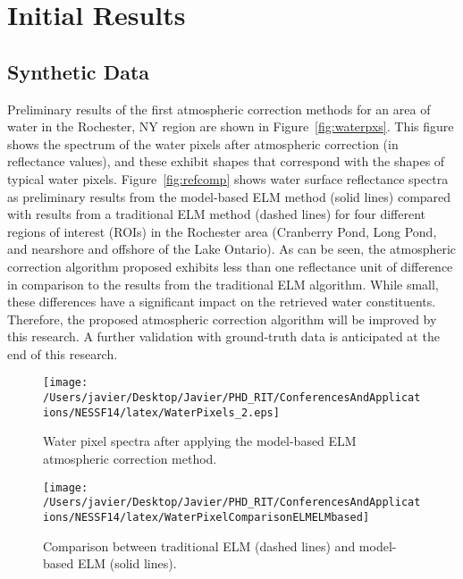 \chapter{Initial Results}
\section{Synthetic Data}
Preliminary results of the first atmospheric correction methods for an area of water in the Rochester, NY region are shown in Figure~\ref{fig:waterpxs}. This figure shows the spectrum of the water pixels after atmospheric correction (in reflectance values), and these exhibit shapes that correspond with the shapes of typical water pixels. Figure~\ref{fig:refcomp} shows water surface reflectance spectra as preliminary results from the model-based ELM method (solid lines) compared with results from a traditional ELM method (dashed lines) for four different regions of interest (ROIs) in the Rochester area (Cranberry Pond, Long Pond, and nearshore and offshore of the Lake Ontario). As can be seen, the atmospheric correction algorithm proposed exhibits less than one reflectance unit of difference in comparison to the results from the traditional ELM algorithm. While small, these differences have a significant impact on the retrieved water constituents. Therefore, the proposed atmospheric correction algorithm will be improved by this research. A further validation with ground-truth data is anticipated at the end of this research.
\vspace{-.3cm}
\begin{figure}[htb]
  \begin{minipage}[c]{0.48\linewidth}
    \centering
      \texttt{[image: /Users/javier/Desktop/Javier/PHD\_RIT/ConferencesAndApplications/NESSF14/latex/WaterPixels\_2.eps]}
      \caption{Water pixel spectra after applying the model-based ELM atmospheric correction method.}
  \end{minipage}
  \hfill
  \begin{minipage}[d]{0.48\linewidth}
    \centering
      \texttt{[image: /Users/javier/Desktop/Javier/PHD\_RIT/ConferencesAndApplications/NESSF14/latex/WaterPixelComparisonELMELMbased]}
      \caption{Comparison between traditional ELM (dashed lines) and model-based ELM (solid lines).}
  \end{minipage}
\end{figure}


